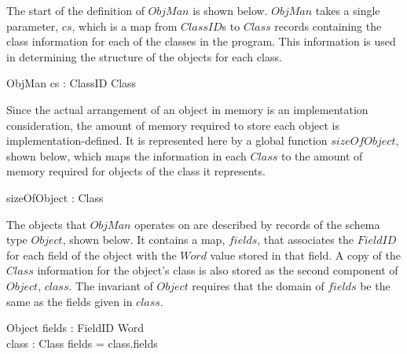 The start of the definition of $ObjMan$ is shown below.
$ObjMan$ takes a single parameter, $cs$, which is a map from
$ClassID$s to $Class$ records containing the class information for
each of the classes in the program.
This information is used in determining the structure of the objects
for each class.
\begin{circus}
  \circprocess ObjMan \circdef cs : ClassID \pfun Class \circspot \circbegin
\end{circus}

Since the actual arrangement of an object in memory is an
implementation consideration, the amount of memory required to store
each object is implementation-defined.
It is represented here by a global function $sizeOfObject$, shown
below, which maps the information in each $Class$ to the amount of
memory required for objects of the class it represents.
\begin{axdef}
  sizeOfObject : Class \fun \nat
\end{axdef}

The objects that $ObjMan$ operates on are described by records of the
schema type $Object$, shown below.
It contains a map, $fields$, that associates the $FieldID$ for each
field of the object with the $Word$ value stored in that field.
A copy of the $Class$ information for the object's class is also
stored as the second component of $Object$, $class$.
The invariant of $Object$ requires that the domain of $fields$ be the
same as the fields given in $class$.
\begin{schema}{Object}
  fields : FieldID \pfun Word \\
  class : Class
\where
  \dom fields = class.fields
\end{schema}      

